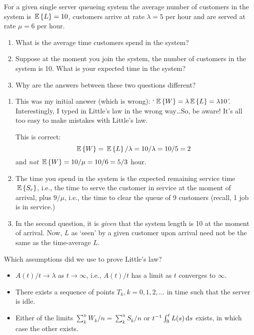 \begin{question}
  For a given single server queueing system the average number of
  customers in the system is $\,\mathbb{E}\left\{L\right\} = 10$, customers arrive at rate
  $\lambda=5$ per hour and are served at rate $\mu=6$ per hour.
  \begin{enumerate}
  \item What is the average time customers spend in the system?
  \item Suppose at the moment you join the system, the number of
    customers in the system is 10. What is your expected time in the
    system? 
  \item Why are the answers between these two questions different?
  \end{enumerate}

    \begin{solution}
      \begin{enumerate}
      \item This was my initial answer (which is wrong):
        `$\,\mathbb{E}\left\{W\right\} = \lambda \,\mathbb{E}\left\{L\right\} = \lambda 10$'.  Interestingly, I typed
        in Little's law in the wrong way\ldots So, be aware! It's all
        too easy to make mistakes with Little's law.

    This is correct: 
    \begin{equation*}
      \,\mathbb{E}\left\{W\right\} = \,\mathbb{E}\left\{L\right\}/\lambda = 10/\lambda = 10/5 = 2
    \end{equation*}
    and \emph{not} $\,\mathbb{E}\left\{W\right\} = 10/\mu=10/6=5/3$ hour.
  \item The time you spend in the system is the expected remaining
    service time $\,\mathbb{E}\left\{S_r\right\}$, i.e., the time to serve the customer in
    service at the moment of arrival, plus $9/\mu$, i.e., the time to
    clear the queue of 9 customers (recall, 1 job is in service.)
  \item In the second question, it is \emph{given} that the system
    length is 10 at the moment of arrival. Now, $L$ as `seen' by a
    given customer upon arrival need not be the same as the
    time-average $L$.
  \end{enumerate}
    \end{solution}
\end{question}

\begin{question}
 Which assumptions did we use to prove Little's law?
  \begin{solution}
    \begin{itemize}
    \item 
 $A(t)/t \to \lambda$ as $t\to \infty$, i.e., $A(t)/t$ has a limit as $t$ converges to $\infty$. 
  \item There exists a sequence of points $T_k, k=0,1,2,\ldots$ in time such that the server is idle. 
  \item Either of the limits $\sum_k^n W_k/n = \sum_k^n S_k /n $ or
    $t^{-1}\int_0^t L(s) \,\text{d}s$ exists, in which case the other exists.
    \end{itemize}
  \end{solution}
\end{question}


